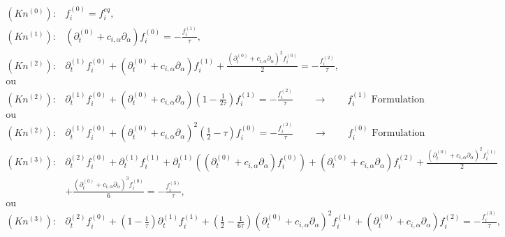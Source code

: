 \documentclass[letterpaper,10pt,english,openany,oneside]{jupyterBook}
\begin{document}
\begin{equation}\label{equation:LBM-Study/Convective-Diffusive-Equation:Chap-Kn-cvdif-NotEq}
\begin{split}
\begin{array}{ll}
    (Kn^{(0)}):& f_{i}^{(0)}= f_{i}^{eq},\\
    (Kn^{(1)}):& \left( \partial_{t}^{(0)} + c_{i,\alpha}\partial_{\alpha} \right)f_{i}^{(0)}= - \displaystyle\frac{ f_{i}^{(1)} }{ \tau } , \\
    (Kn^{(2)}):& \partial_{t}^{(1)} f_{i}^{(0)} + \left( \partial_{t}^{(0)} + c_{i,\alpha}\partial_{\alpha} \right)f_{i}^{(1)} + \displaystyle\frac{\left( \partial_{t}^{(0)} + c_{i,\alpha}\partial_{\alpha} \right)^{2} f_{i}^{(0)}}{2}= - \displaystyle\frac{ f_{i}^{(2)} }{ \tau },\\
    \textrm{ou}& \\
    (Kn^{(2)}):& \partial_{t}^{(1)} f_{i}^{(0)} + \left( \partial_{t}^{(0)} + c_{i,\alpha}\partial_{\alpha} \right)\displaystyle\left(1 - \frac{1}{2\tau}\right) f_{i}^{(1)} =  - \displaystyle\frac{ f_{i}^{(2)} }{ \tau } \quad\quad \rightarrow \quad\quad  f_{i}^{(1)}\textrm{ Formulation} \\
    \textrm{ou}& \\
    (Kn^{(2)}):& \partial_{t}^{(1)} f_{i}^{(0)} + \left( \partial_{t}^{(0)} + c_{i,\alpha}\partial_{\alpha} \right)^{2} \displaystyle\left(\frac{1}{2} - \tau\right) f_{i}^{(0)} =  - \displaystyle\frac{ f_{i}^{(2)} }{ \tau } \quad\quad \rightarrow  \quad\quad f_{i}^{(0)}\textrm{ Formulation} \\
    (Kn^{(3)}):& \partial_{t}^{(2)} f_{i}^{(0)} +\partial_{t}^{(1)} f_{i}^{(1)} + \partial_{t}^{(1)}\left( \left( \partial_{t}^{(0)} + c_{i,\alpha}\partial_{\alpha} \right)f_{i}^{(0)} \right) + \left( \partial_{t}^{(0)} + c_{i,\alpha}\partial_{\alpha} \right)f_{i}^{(2)} + \displaystyle\frac{\left( \partial_{t}^{(0)} + c_{i,\alpha}\partial_{\alpha} \right)^{2} f_{i}^{(1)}}{2} \\
    & +  \displaystyle\frac{\left( \partial_{t}^{(0)} + c_{i,\alpha}\partial_{\alpha} \right)^{3} f_{i}^{(0)}}{6} = - \displaystyle\frac{ f_{i}^{(3)} }{ \tau },  \\
    \textrm{ou}& \\
    (Kn^{(3)}):& \partial_{t}^{(2)} f_{i}^{(0)} + \left(1-\displaystyle\frac{1}{\tau}\right)\partial_{t}^{(1)} f_{i}^{(1)} + \displaystyle\left(\frac{1}{2} - \frac{1}{6\tau}\right) \left( \partial_{t}^{(0)} + c_{i,\alpha}\partial_{\alpha} \right)^{2} f_{i}^{(1)} + \left( \partial_{t}^{(0)} + c_{i,\alpha}\partial_{\alpha} \right)f_{i}^{(2)} =  - \displaystyle\frac{f_{i}^{(3)}}{\tau},
 \end{array}
\end{split}
\end{equation}
\sphinxAtStartPar
{}
\end{document}

